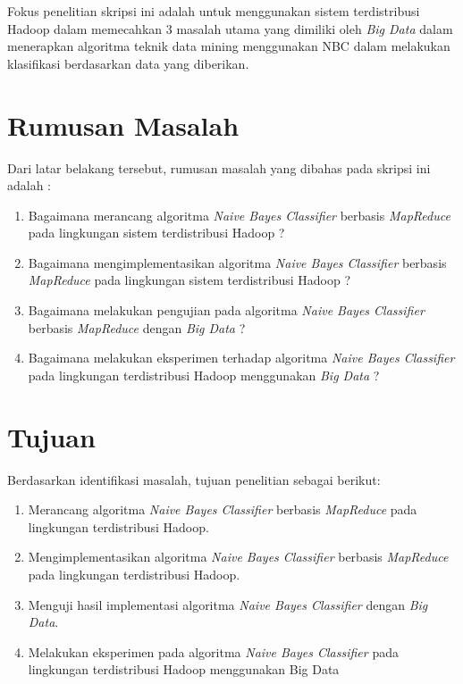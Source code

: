 Fokus penelitian skripsi ini adalah untuk menggunakan sistem terdistribusi Hadoop dalam memecahkan 3 masalah utama yang dimiliki oleh \textit{Big Data} dalam menerapkan algoritma teknik data mining menggunakan NBC dalam melakukan klasifikasi berdasarkan data yang diberikan.

\section{Rumusan Masalah}
Dari latar belakang tersebut, rumusan masalah yang dibahas pada skripsi ini adalah :
\begin{enumerate}
	\item Bagaimana merancang algoritma {\it Naive Bayes Classifier} berbasis \textit{MapReduce} pada lingkungan sistem terdistribusi Hadoop ?
	\item Bagaimana mengimplementasikan algoritma {\it Naive Bayes Classifier} berbasis \textit{MapReduce} pada lingkungan sistem terdistribusi Hadoop ?
	\item Bagaimana melakukan pengujian pada algoritma \textit{Naive Bayes Classifier} berbasis \textit{MapReduce} dengan \textit{Big Data} ?	
	\item Bagaimana melakukan eksperimen terhadap algoritma \textit{Naive Bayes Classifier} pada lingkungan terdistribusi Hadoop menggunakan \textit{Big Data} ?
\end{enumerate}

\section{Tujuan}
Berdasarkan identifikasi masalah, tujuan penelitian sebagai berikut:
\begin{enumerate}
	\item Merancang algoritma \textit{Naive Bayes Classifier} berbasis \textit{MapReduce} pada lingkungan terdistribusi Hadoop.
	\item Mengimplementasikan algoritma \textit{Naive Bayes Classifier} berbasis \textit{MapReduce} pada lingkungan terdistribusi Hadoop.
	\item Menguji hasil implementasi algoritma \textit{Naive Bayes Classifier} dengan \textit{Big Data}.
	\item Melakukan eksperimen pada algoritma \textit{Naive Bayes Classifier} pada lingkungan terdistribusi Hadoop menggunakan Big Data
\end{enumerate}

